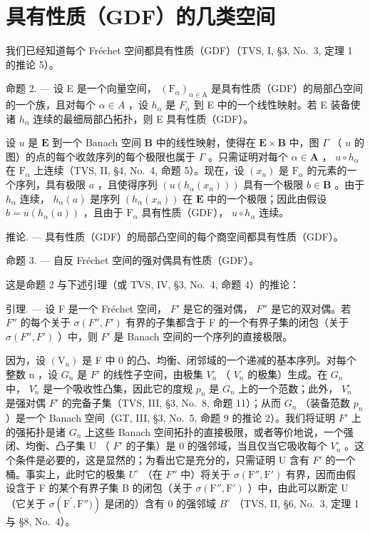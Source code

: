 \section{具有性质（GDF）的几类空间}

我们已经知道每个 Fréchet 空间都具有性质（GDF）（TVS, I, §3, No.~3, 定理 1 的推论 5）。

命题 2. --- 设 E 是一个向量空间， \((\mathrm{F}_{\alpha})_{\alpha\in\mathrm{A}}\) 是具有性质（GDF）的局部凸空间的一个族，且对每个 \(\alpha\in A\) ，设 \(h_{\alpha}\) 是 \(F_{\alpha}\) 到 E 中的一个线性映射。若 E 装备使诸 \(h_{\alpha}\) 连续的最细局部凸拓扑，则 E 具有性质（GDF）。

设 \(u\) 是 \(\mathbf{E}\) 到一个 Banach 空间 \(\mathbf{B}\) 中的线性映射，使得在 \(\mathbf{E} \times \mathbf{B}\) 中，图 \(\Gamma\) （ \(u\) 的图）的点的每个收敛序列的每个极限也属于 \(\Gamma\) 。只需证明对每个 \(\alpha \in \mathbf{A}\) ， \(u \circ h_{\alpha}\) 在 \(\mathrm{F}_{\alpha}\) 上连续（TVS, II, §4, No.~4, 命题 5）。现在，设 \((x_n)\) 是 \(\mathrm{F}_{\alpha}\) 的元素的一个序列，具有极限 \(a\) ，且使得序列 \(\left(u(h_{\alpha}(x_n))\right)\) 具有一个极限 \(b \in \mathbf{B}\) 。由于 \(h_{\alpha}\) 连续， \(h_{\alpha}(a)\) 是序列 \((h_{\alpha}(x_n))\) 在 \(\mathbf{E}\) 中的一个极限；因此由假设 \(b = u(h_{\alpha}(a))\) ，且由于 \(\mathrm{F}_{\alpha}\) 具有性质（GDF）， \(u \circ h_{\alpha}\) 连续。

推论. --- 具有性质（GDF）的局部凸空间的每个商空间都具有性质（GDF）。

命题 3. --- 自反 Fréchet 空间的强对偶具有性质（GDF）。

这是命题 2 与下述引理（或 TVS, IV, §3, No.~4, 命题 4）的推论：

引理. --- 设 F 是一个 Fréchet 空间， \(F'\) 是它的强对偶， \(F''\) 是它的双对偶。若 \(F''\) 的每个关于 \(\sigma(F'', F')\) 有界的子集都含于 F 的一个有界子集的闭包（关于 \(\sigma(F'', F')\) ）中，则 \(F'\) 是 Banach 空间的一个序列的直接极限。

因为，设 \((\mathrm{V}_{n})\) 是 F 中 0 的凸、均衡、闭邻域的一个递减的基本序列。对每个整数 n ，设 \(G_{n}\) 是 \(F'\) 的线性子空间，由极集 \(V_{n}^{\circ}\) （ \(V_{n}\) 的极集）生成。在 \(G_{n}\) 中， \(V_{n}^{\circ}\) 是一个吸收性凸集，因此它的度规 \(p_{n}\) 是 \(G_{n}\) 上的一个范数；此外， \(V_{n}^{\circ}\) 是强对偶 \(F'\) 的完备子集（TVS, III, §3, No.~8, 命题 11）；从而 \(G_{n}\) （装备范数 \(p_{n}\) ）是一个 Banach 空间（GT, III, §3, No.~5, 命题 9 的推论 2）。我们将证明 \(F'\) 上的强拓扑是诸 \(G_{n}\) 上这些 Banach 空间拓扑的直接极限，或者等价地说，一个强闭、均衡、凸子集 U （ \(F'\) 的子集）是 0 的强邻域，当且仅当它吸收每个 \(V_{n}^{\circ}\) 。这个条件是必要的，这是显然的；为看出它是充分的，只需证明 U 含有 \(F'\) 的一个桶。事实上，此时它的极集 \(U^{\circ}\) （在 \(F''\) 中）将关于 \(\sigma(\mathrm{F}''\mathrm{,}\mathrm{F}')\) 有界，因而由假设含于 F 的某个有界子集 B 的闭包（关于 \(\sigma(\mathrm{F}''\mathrm{,}\mathrm{F}')\) ）中，由此可以断定 U （它关于 \(\sigma(\mathrm{F}^{\prime},\mathrm{F}''\mathrm{)})\) 是闭的）含有 0 的强邻域 \(B^{\circ}\) （TVS, II, §6, No.~3, 定理 1 与 §8, No.~4）。

